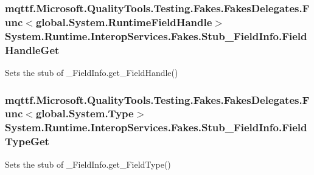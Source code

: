 \hypertarget{class_system_1_1_runtime_1_1_interop_services_1_1_fakes_1_1_stub___field_info_ad553ccb9decad4de5e39c1775a08645c}{
\subsubsection[{Field\-Handle\-Get}]{\setlength{\rightskip}{0pt plus 5cm}mqttf.\-Microsoft.\-Quality\-Tools.\-Testing.\-Fakes.\-Fakes\-Delegates.\-Func$<$global.\-System.\-Runtime\-Field\-Handle$>$ System.\-Runtime.\-Interop\-Services.\-Fakes.\-Stub\-\_\-\-Field\-Info.\-Field\-Handle\-Get}}\label{class_system_1_1_runtime_1_1_interop_services_1_1_fakes_1_1_stub___field_info_ad553ccb9decad4de5e39c1775a08645c}


Sets the stub of \-\_\-\-Field\-Info.\-get\-\_\-\-Field\-Handle()

\hypertarget{class_system_1_1_runtime_1_1_interop_services_1_1_fakes_1_1_stub___field_info_a4656cc895cf577c86e745431b84e3920}{
\subsubsection[{Field\-Type\-Get}]{\setlength{\rightskip}{0pt plus 5cm}mqttf.\-Microsoft.\-Quality\-Tools.\-Testing.\-Fakes.\-Fakes\-Delegates.\-Func$<$global.\-System.\-Type$>$ System.\-Runtime.\-Interop\-Services.\-Fakes.\-Stub\-\_\-\-Field\-Info.\-Field\-Type\-Get}}\label{class_system_1_1_runtime_1_1_interop_services_1_1_fakes_1_1_stub___field_info_a4656cc895cf577c86e745431b84e3920}


Sets the stub of \-\_\-\-Field\-Info.\-get\-\_\-\-Field\-Type()

